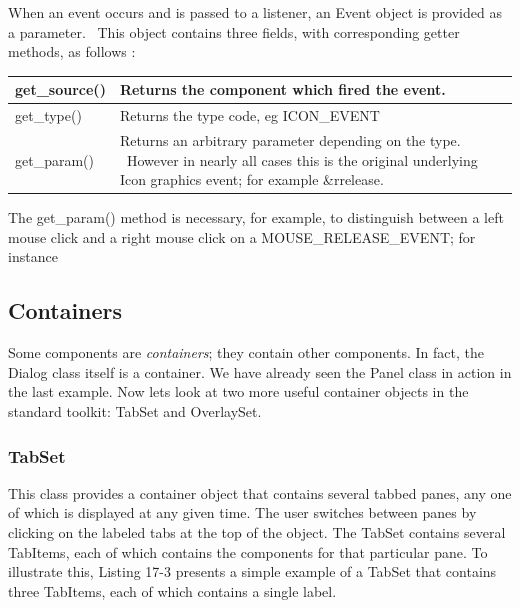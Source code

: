 When an event occurs and is passed to a listener, an \textsf{Event}
object is provided as a parameter. \ This object contains three fields,
with corresponding getter methods, as follows :

\begin{center}
\tablehead{}
\begin{supertabular}{|m{2.9212599in}|m{2.9212599in}|}
\hline
\sffamily\mdseries get\_source() &
Returns the component which fired the event.\\\hline
\sffamily\mdseries get\_type() &
Returns the type code, eg \textsf{ICON\_EVENT}\\\hline
\sffamily\mdseries get\_param() &
Returns an arbitrary parameter depending on the type. \ However in
nearly all cases this is the original underlying Icon graphics event;
for example \textsf{\&rrelease}.\\\hline
\end{supertabular}
\end{center}
The \textsf{get\_param()} method is necessary, for example, to
distinguish between a left mouse click and a right mouse click on a
\textsf{MOUSE\_RELEASE\_EVENT}; for instance 


\subsection{Containers}
Some components are \textit{containers}; they contain other components.
In fact, the \textsf{Dialog} class itself is a container. We have
already seen the \textsf{Panel} class in action in the last example.
Now let{\textquotesingle}s look at two more useful container objects in the standard toolkit: \textsf{TabSet}
and \textsf{OverlaySet}.

\subsubsection[TabSet]{\sffamily TabSet}
This class provides a container object that contains several tabbed panes, any one of which is displayed at any given
time. The user switches between panes by clicking on the labeled tabs
at the top of the object. The \textsf{TabSet} contains several
\textsf{TabItems}, each of which contains the components for that
particular pane. To illustrate this, Listing 17-3 presents a simple
example of a \textsf{TabSet} that contains three \textsf{TabItems},
each of which contains a single label.

